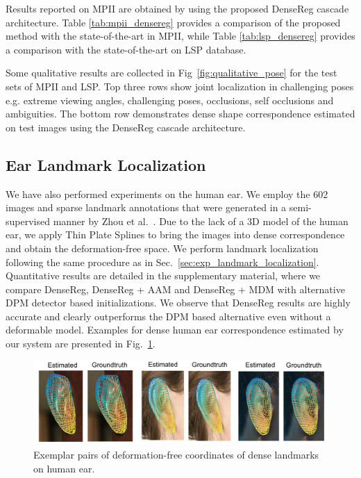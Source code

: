 Results reported on MPII are obtained by using the proposed DenseReg cascade architecture. Table \ref{tab:mpii_densereg} provides a comparison of the proposed method with the state-of-the-art in MPII, while Table \ref{tab:lsp_densereg} provides a comparison with the state-of-the-art on LSP database.

Some qualitative results are collected in Fig~\ref{fig:qualitative_pose} for the test sets of MPII and LSP. Top three rows show joint localization in challenging poses e.g. extreme viewing angles, challenging poses, occlusions, self occlusions and ambiguities. The bottom row demonstrates dense shape correspondence estimated on test images using the DenseReg cascade architecture.

 
\subsection{Ear Landmark Localization}
\label{sec:exp_ear}

We have also performed experiments on the human ear. We employ the $602$ images and sparse landmark annotations that were generated in a semi-supervised manner by Zhou et al.~\cite{Zhou_2016_CVPR}. Due to the lack of a 3D model of the human ear, we apply Thin Plate Splines to bring the images into dense correspondence and obtain the deformation-free space. We perform landmark localization following the same procedure as in Sec.~\ref{sec:exp_landmark_localization}.
Quantitative results are detailed in the supplementary material, where we compare DenseReg, DenseReg + AAM and DenseReg + MDM with alternative DPM detector based initializations.  We observe that DenseReg results are highly accurate and clearly outperforms the DPM based alternative even without a deformable model. Examples for dense human ear correspondence estimated by our system  are presented in Fig.~\ref{fig:ears_examples}.


\begin{figure}[ht]
\centering
\includegraphics[width=\linewidth]{resources/Human_Poses/ears3}
\caption{Exemplar pairs of deformation-free coordinates of dense landmarks on human ear.}
\label{fig:ears_examples}
\end{figure}


